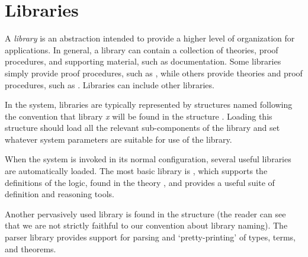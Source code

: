 \chapter{Libraries}\label{HOLlibraries}

%



\newcommand{\simpset}{simpset}
\newcommand{\Simpset}{Simpset}

 \newcommand{\term}      {\mbox{\it term}}
 \newcommand{\vstr}      {\mbox{\it vstr}}

A \emph{library} is an abstraction intended to provide a higher level
of organization for \HOL{} applications. In general, a library can
contain a collection of theories, proof procedures, and supporting
material, such as documentation. Some libraries simply provide proof
procedures, such as , while others provide theories and
proof procedures, such as . Libraries can include other
libraries.

In the \HOL{} system, libraries are typically represented by \ML{}
structures named following the convention that library \emph{x} will
be found in the \ML{} structure . Loading this structure
should load all the relevant sub-components of the library and set
whatever system parameters are suitable for use of the library.

When the \HOL{} system is invoked in its normal configuration, several
useful libraries are automatically loaded. The most basic \HOL{}
library is , which supports the definitions of the \HOL{}
logic, found in the theory , and provides a useful
suite of definition and reasoning tools.

Another pervasively used library is found in the structure 
(the reader can see that we are not strictly faithful to our
convention about library naming). The parser library provides support
for parsing and `pretty-printing' of \HOL{} types, terms, and
theorems.


